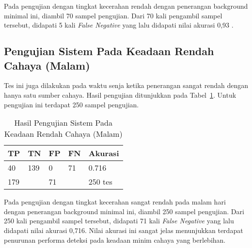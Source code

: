 \par Pada pengujian dengan tingkat kecerahan rendah dengan penerangan background minimal ini, diambil 70 sampel pengujian. Dari 70 kali pengambil sampel tersebut, didapati 5 kali \emph{False Negative} yang lalu didapati nilai akurasi 0,93 .


\subsection{Pengujian Sistem Pada Keadaan Rendah Cahaya (Malam)}
\label{subsec:systest_test_lowilu_malam}

\par Tes ini juga dilakukan pada waktu senja ketika penerangan sangat rendah dengan hanya satu sumber cahaya. Hasil pengujian ditunjukkan pada Tabel~\ref{tb:systest_lowillum_dark}. Untuk pengujian ini terdapat 250 sampel pengujian.

\begin{table}
    \centering
    \caption{Hasil Pengujian Sistem Pada Keadaan Rendah Cahaya (Malam)}
    \label{tb:systest_lowillum_dark}
    \begin{tabular}{|l|l|l|l|l|} 
      \hline
      TP & TN                     & FP & FN                 & Akurasi  \\ 
      \hline
      40 & 139                    & 0  & 71                 & 0.716     \\ 
      \hline
      \multicolumn{2}{|l|}{179}   & \multicolumn{2}{l|}{71} &  250 tes    \\
      \hline
    \end{tabular}
\end{table}

\par Pada pengujian dengan tingkat kecerahan sangat rendah pada malam hari dengan penerangan background minimal ini, diambil 250 sampel pengujian. Dari 250 kali pengambil sampel tersebut, didapati 71 kali \emph{False Negative} yang lalu didapati nilai akurasi 0,716. Nilai akurasi ini sangat jelas menunjukkan terdapat penurunan performa deteksi pada keadaan minim cahaya yang berlebihan.

